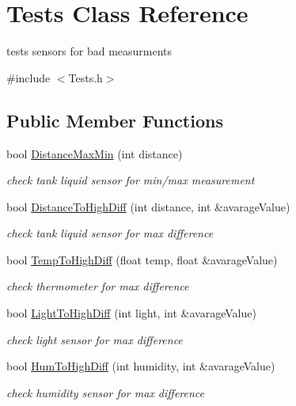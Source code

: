 \hypertarget{class_tests}{}\section{Tests Class Reference}
\label{class_tests}


tests sensors for bad measurments  




{\ttfamily \#include $<$Tests.\+h$>$}

\subsection*{Public Member Functions}
\begin{DoxyCompactItemize}
\item 
bool \hyperlink{class_tests_ab1ed07135604b11e2811f3532ec75727}{Distance\+Max\+Min} (int distance)
\begin{DoxyCompactList}\small\item\em check tank liquid sensor for min/max measurement \end{DoxyCompactList}\item 
bool \hyperlink{class_tests_aeb41ab6579c191e60fd53d4d78ffd989}{Distance\+To\+High\+Diff} (int distance, int \&avarage\+Value)
\begin{DoxyCompactList}\small\item\em check tank liquid sensor for max difference \end{DoxyCompactList}\item 
bool \hyperlink{class_tests_aaa57adb084c84b341dcdaee8bf13565a}{Temp\+To\+High\+Diff} (float temp, float \&avarage\+Value)
\begin{DoxyCompactList}\small\item\em check thermometer for max difference \end{DoxyCompactList}\item 
bool \hyperlink{class_tests_ae7ec7494687c1d3ba34419b5ac4860f2}{Light\+To\+High\+Diff} (int light, int \&avarage\+Value)
\begin{DoxyCompactList}\small\item\em check light sensor for max difference \end{DoxyCompactList}\item 
bool \hyperlink{class_tests_ae4b5d0485e34ee8a4cd8a1e347da12b9}{Hum\+To\+High\+Diff} (int humidity, int \&avarage\+Value)
\begin{DoxyCompactList}\small\item\em check humidity sensor for max difference \end{DoxyCompactList}\end{DoxyCompactItemize}
